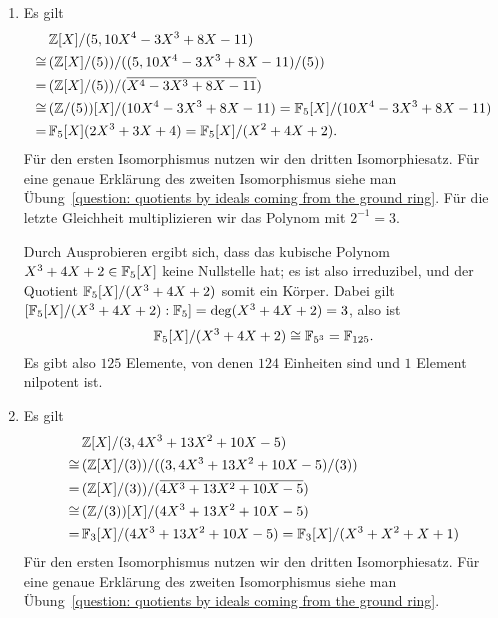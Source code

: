 \begin{solution}
  \begin{enumerate}
    \item
      Es gilt
      \begin{align*}
             &\,  \mathbb{Z}[X]/(5, 10 X^4 - 3 X^3 + 8 X - 11)
        \\
        \cong&\,  ( \mathbb{Z}[X]/(5) ) / ( (5, 10 X^4 - 3 X^3 + 8 X - 11)/(5) )
        \\
            =&\,  ( \mathbb{Z}[X]/(5) ) / ( \overline{X^4 - 3 X^3 + 8 X - 11} )
        \\
        \cong&\,  (\mathbb{Z}/(5))[X] / (10 X^4 - 3 X^3 + 8 X - 11)
            =     \mathbb{F}_5[X]/(10 X^4 - 3 X^3 + 8 X - 11)
        \\
            =&\,  \mathbb{F}_5[X](2 X^3 + 3 X + 4)
            =     \mathbb{F}_5[X]/(X^2 + 4 X + 2).
      \end{align*}
      Für den ersten Isomorphismus nutzen wir den dritten Isomorphiesatz.
      Für eine genaue Erklärung des zweiten Isomorphismus siehe man Übung~\ref{question: quotients by ideals coming from the ground ring}.
      Für die letzte Gleichheit multiplizieren wir das Polynom mit $2^{-1} = 3$.
      
      Durch Ausprobieren ergibt sich, dass das kubische Polynom $X^3 + 4 X + 2 \in \mathbb{F}_5[X]$ keine Nullstelle hat; es ist also irreduzibel, und der Quotient $\mathbb{F}_5[X]/(X^3 + 4 X + 2)$ somit ein Körper.
      Dabei gilt $[\mathbb{F}_5[X]/(X^3 + 4 X + 2) : \mathbb{F}_5] = \deg (X^3 + 4 X + 2) = 3$, also ist
      \[
              \mathbb{F}_5[X]/(X^3 + 4 X + 2)
        \cong \mathbb{F}_{5^3}
        =     \mathbb{F}_{125}.
      \]
      Es gibt also $125$ Elemente, von denen $124$ Einheiten sind und $1$ Element nilpotent ist.
      
    \item
      Es gilt
      \begin{align*}
             &\,  \mathbb{Z}[X]/(3, 4 X^3 + 13 X^2 + 10 X - 5)
        \\
        \cong&\,  (\mathbb{Z}[X] / (3)) / ( (3, 4 X^3 + 13 X^2 + 10 X - 5) / (3) )
        \\
            =&\,  (\mathbb{Z}[X] / (3)) / ( \overline{4 X^3 + 13 X^2 + 10 X - 5} )
        \\
        \cong&\,  (\mathbb{Z}/(3))[X] / (4 X^3 + 13 X^2 + 10 X - 5)
        \\
            =&\,  \mathbb{F}_3[X] / (4 X^3 + 13 X^2 + 10 X - 5)
            =     \mathbb{F}_3[X] / (X^3 + X^2 + X + 1)
      \end{align*}
      Für den ersten Isomorphismus nutzen wir den dritten Isomorphiesatz.
      Für eine genaue Erklärung des zweiten Isomorphismus siehe man Übung~\ref{question: quotients by ideals coming from the ground ring}.
      

\end{enumerate}
\end{solution}
